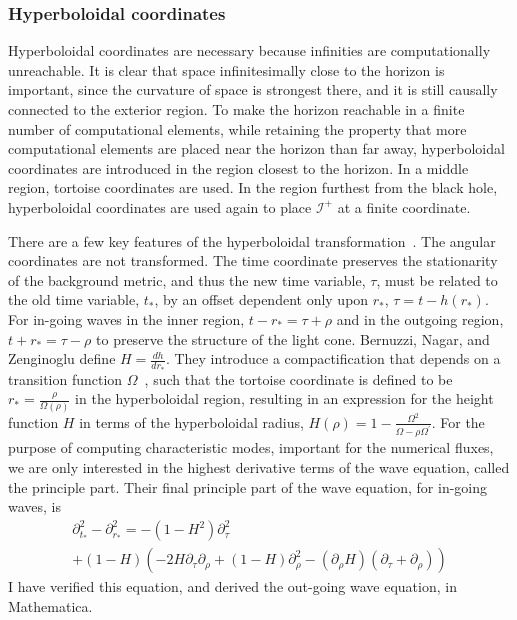 \subsubsection{Hyperboloidal coordinates}  
Hyperboloidal coordinates are necessary because infinities are computationally unreachable. It is clear that space infinitesimally close to the horizon is important, since the curvature of space is strongest there, and it is still causally connected to the exterior region. To make the horizon reachable in a finite number of computational elements, while retaining the property that more computational elements are placed near the horizon than far away, hyperboloidal coordinates are introduced in the region closest to the horizon. In a middle region, tortoise coordinates are used. In the region furthest from the black hole, hyperboloidal coordinates are used again to place $\mathcal{I}^+$ at a finite coordinate. 



There are a few key features of the hyperboloidal transformation~\cite{hyperboloidalcoordinates}. The angular coordinates are not transformed. The time coordinate preserves the stationarity of the background metric, and thus the new time variable, $\tau$, must be related to the old time variable, $t_*$, by an offset dependent only upon $r_*$, $\tau=t-h(r_*)$. For in-going waves in the inner region, $t-r_*=\tau+\rho$ and in the outgoing region, $t+r_*=\tau-\rho$ to preserve the structure of the light cone. Bernuzzi, Nagar, and Zenginoglu define $H=\frac{dh}{dr_*}$. They introduce a compactification that depends on a transition function $\Omega$~\cite{OmegaTransferFunction}, such that the tortoise coordinate is defined to be  $r_*=\frac{\rho}{\Omega(\rho)}$ in the hyperboloidal region, resulting in an expression for the height function $H$ in terms of the hyperboloidal radius,  $H(\rho)=1-\frac{\Omega^2}{\Omega-\rho\Omega^\prime}$. For the purpose of computing characteristic modes, important for the numerical fluxes, we are only interested in the highest derivative terms of the wave equation, called the principle part. Their final principle part of the wave equation, for in-going waves, is~\cite{hyperboloidalCoordinates}
  \begin{eqnarray}
    \partial_{t_*}^2-\partial_{r_*}^2=-(1-H^2)\partial_\tau^2\nonumber\\
    +(1-H)(-2H\partial_\tau\partial_\rho+(1-H)\partial_\rho^2-(\partial_\rho H)(\partial_\tau+\partial_\rho))
  \end{eqnarray}    
I have verified this equation, and derived the out-going wave equation, in Mathematica.

